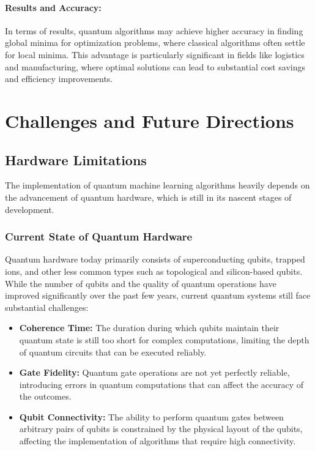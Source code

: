 \documentclass{book}
\begin{document}
\paragraph{Results and Accuracy:} In terms of results, quantum algorithms may achieve higher accuracy in finding global minima for optimization problems, where classical algorithms often settle for local minima. This advantage is particularly significant in fields like logistics and manufacturing, where optimal solutions can lead to substantial cost savings and efficiency improvements.
\section{Challenges and Future Directions}

\subsection{Hardware Limitations}
The implementation of quantum machine learning algorithms heavily depends on the advancement of quantum hardware, which is still in its nascent stages of development.

\subsubsection{Current State of Quantum Hardware}
Quantum hardware today primarily consists of superconducting qubits, trapped ions, and other less common types such as topological and silicon-based qubits. While the number of qubits and the quality of quantum operations have improved significantly over the past few years, current quantum systems still face substantial challenges:
\begin{itemize}
    \item \textbf{Coherence Time:} The duration during which qubits maintain their quantum state is still too short for complex computations, limiting the depth of quantum circuits that can be executed reliably.
    \item \textbf{Gate Fidelity:} Quantum gate operations are not yet perfectly reliable, introducing errors in quantum computations that can affect the accuracy of the outcomes.
    \item \textbf{Qubit Connectivity:} The ability to perform quantum gates between arbitrary pairs of qubits is constrained by the physical layout of the qubits, affecting the implementation of algorithms that require high connectivity.
\end{itemize}
\end{document}
